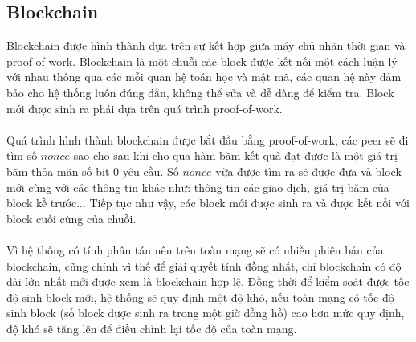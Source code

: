 \subsection{Blockchain}
Blockchain được hình thành dựa trên sự kết hợp giữa máy chủ nhãn thời gian và proof-of-work. Blockchain 
là một chuỗi các block được kết nối một cách luận lý với nhau thông qua các mỗi
quan hệ toán học và mật mã, các quan hệ này đảm bảo cho hệ thống luôn đúng đắn,
không thể sửa và dễ dàng để kiểm tra. Block mới được sinh ra phải dựa trên quá
trình proof-of-work.\\\\
Quá trình hình thành blockchain được bắt đầu bằng proof-of-work, các peer sẽ đi
tìm số $nonce$ sao cho sau khi cho qua hàm băm kết quả đạt được là một giá trị 
băm thỏa mãn số bit 0 yêu cầu. Số $nonce$ vừa được tìm ra sẽ được đưa và block
mới cùng với các thông tin khác như: thông tin các giao dịch, giá trị băm của 
block kề trước... Tiếp tục như vậy, các block mới được sinh ra và được kết nối 
với block cuối cùng của chuỗi.\\\\
Vì hệ thống có tính phân tán nên trên toàn mạng sẽ có nhiều phiên bản của blockchain,
cũng chính vì thế để giải quyết tính đồng nhất, chỉ blockchain có độ dài lớn 
nhất mới được xem là blockchain hợp lệ. Đồng thời để kiểm soát được tốc độ sinh
block mới, hệ thống sẽ quy định một độ khó, nếu toàn mạng có tốc độ sinh block 
(số block được sinh ra trong một giờ đồng hồ) cao hơn mức quy định, độ khó sẽ tăng lên 
để điều chỉnh lại tốc độ của toàn mạng.
